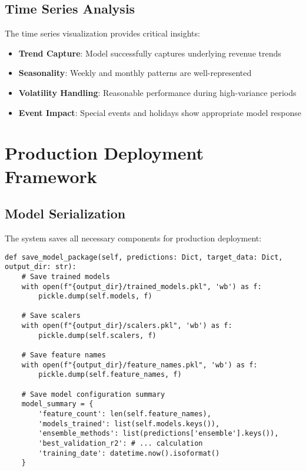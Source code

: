 \documentclass[12pt,a4paper]{article}
\begin{document}
\subsection{Time Series Analysis}

The time series visualization provides critical insights:

\begin{itemize}
    \item \textbf{Trend Capture}: Model successfully captures underlying revenue trends
    \item \textbf{Seasonality}: Weekly and monthly patterns are well-represented
    \item \textbf{Volatility Handling}: Reasonable performance during high-variance periods
    \item \textbf{Event Impact}: Special events and holidays show appropriate model response
\end{itemize}

\section{Production Deployment Framework}

\subsection{Model Serialization}

The system saves all necessary components for production deployment:

\begin{lstlisting}[caption=Model Package Creation]
def save_model_package(self, predictions: Dict, target_data: Dict, output_dir: str):
    # Save trained models
    with open(f"{output_dir}/trained_models.pkl", 'wb') as f:
        pickle.dump(self.models, f)
    
    # Save scalers
    with open(f"{output_dir}/scalers.pkl", 'wb') as f:
        pickle.dump(self.scalers, f)
    
    # Save feature names
    with open(f"{output_dir}/feature_names.pkl", 'wb') as f:
        pickle.dump(self.feature_names, f)
    
    # Save model configuration summary
    model_summary = {
        'feature_count': len(self.feature_names),
        'models_trained': list(self.models.keys()),
        'ensemble_methods': list(predictions['ensemble'].keys()),
        'best_validation_r2': # ... calculation
        'training_date': datetime.now().isoformat()
    }
\end{lstlisting}
\end{document}
